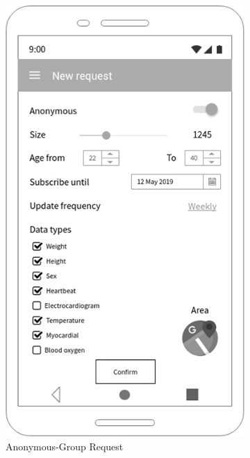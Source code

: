 \begin{figure}[h!]
 \centering
  \begin{subfigure}[b]{0.4\linewidth}
    \includegraphics[width=\linewidth]{img/mockup/tp_areq.jpg}
    \caption{Anonymous-Group Request}
  \end{subfigure}
 ~ ~ ~ ~ ~ ~ 
  \begin{subfigure}[b]{0.4\linewidth}

\end{subfigure}
\end{figure}
